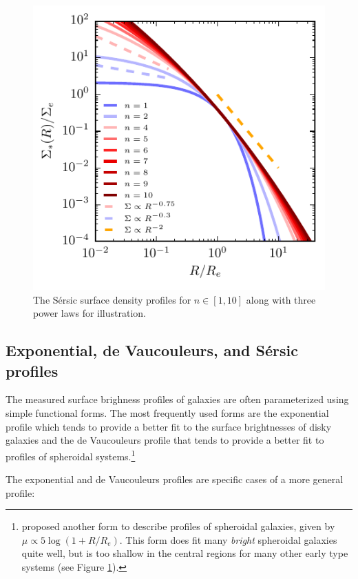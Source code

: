 \begin{figure}[t]
\centerline{
\includegraphics[scale=1.75]{fig/sersic_pro.pdf}
}
\caption{The S\'ersic surface density profiles for $n\in[1,10]$ along with three power laws for illustration.  \label{fig:sersic_pro}}
\end{figure}


\subsection{Exponential, de Vaucouleurs, and S\'ersic profiles}

The measured surface brighness profiles of galaxies are often parameterized using simple functional forms. 
The most frequently used forms are the exponential profile which tends to provide a better fit to the surface brightnesses of disky galaxies and the de Vaucouleurs profile \href{http://adsabs.harvard.edu/abs/1953MNRAS.113..134D}{\citep{devaucouleurs53}} that tends to provide a better fit to profiles of  spheroidal systems.\footnote{\href{http://adsabs.harvard.edu/abs/1930ApJ....71..231H}{\citet{hubble30}} proposed another form to describe profiles of spheroidal galaxies, given by $\mu\propto 5\log(1+R/R_e)$. This form does fit many {\it bright} spheroidal galaxies quite well, but is too shallow in the central regions for many other early type systems (see Figure \ref{fig:sersic_pro}).} 

The exponential and de Vaucouleurs profiles are specific cases of a more general \citet{sersic68}  profile:

